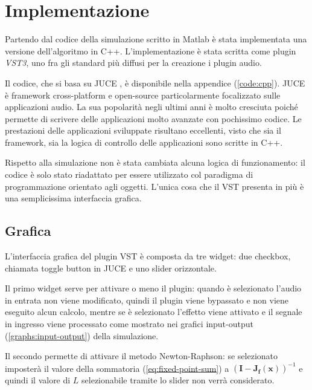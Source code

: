 \chapter{Implementazione}
	\label{sec:implementazione}
	Partendo dal codice della simulazione scritto in Matlab è stata implementata una versione dell'algoritmo in C++. L'implementazione è stata scritta come plugin \textit{VST3}, uno fra gli standard più diffusi per la creazione i plugin audio.
	
	Il codice, che si basa su JUCE \cite{juce}, è disponibile nella appendice (\ref{code:cpp}). JUCE è framework cross-platform e open-source particolarmente focalizzato sulle applicazioni audio. La sua popolarità negli ultimi anni è molto cresciuta poiché permette di scrivere delle applicazioni molto avanzate con pochissimo codice. Le prestazioni delle applicazioni sviluppate risultano eccellenti, visto che sia il framework, sia la logica di controllo delle applicazioni sono scritte in C++.
	
	Rispetto alla simulazione non è stata cambiata alcuna logica di funzionamento: il codice è solo stato riadattato per essere utilizzato col paradigma di programmazione orientato agli oggetti. L'unica cosa che il VST presenta in più è una semplicissima interfaccia grafica.
	\pagebreak
	
	\section{Grafica}
		L'interfaccia grafica del plugin VST è composta da tre widget: due checkbox, chiamata toggle button in JUCE e uno slider orizzontale.
		
		
		Il primo widget serve per attivare o meno il plugin: quando è selezionato l'audio in entrata non viene modificato, quindi il plugin viene bypassato e non viene eseguito alcun calcolo, mentre se è selezionato l'effetto viene attivato e il segnale in ingresso viene processato come mostrato nei grafici input-output (\ref{graphs:input-output}) della simulazione.
		
		Il secondo permette di attivare il metodo Newton-Raphson: se selezionato imposterà il valore della sommatoria (\ref{eq:fixed-point-sum}) a $(\mathbf{I}-\mathbf{J_{f}(x)})^{-1}$ e quindi il valore di $L$ selezionabile tramite lo slider non verrà considerato.
		
		
